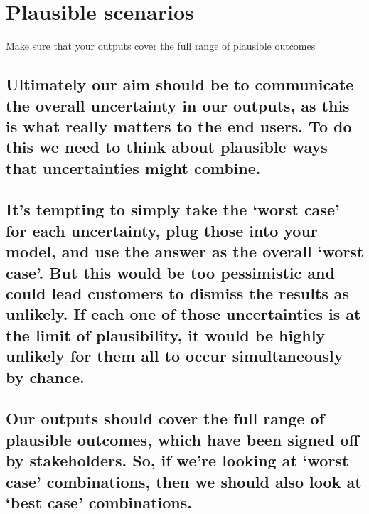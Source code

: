 \documentclass[]{book}
\begin{document}
\section{Plausible scenarios}\label{plausible-scenarios}

 Make sure that your outputs cover the full range of plausible outcomes

\subsection{Ultimately our aim should be to communicate the overall
uncertainty in our outputs, as this is what really matters to the end
users. To do this we need to think about plausible ways that
uncertainties might
combine.}\label{ultimately-our-aim-should-be-to-communicate-the-overall-uncertainty-in-our-outputs-as-this-is-what-really-matters-to-the-end-users.-to-do-this-we-need-to-think-about-plausible-ways-that-uncertainties-might-combine.}

\subsection{\texorpdfstring{It's tempting to simply take the `worst
case' for each uncertainty, plug those into your model, and use the
answer as the overall `worst case'. But this would be too pessimistic
and could lead customers to dismiss the results as unlikely. If each one
of those uncertainties is at the limit of plausibility, it would be
highly unlikely for them all to occur simultaneously by
chance.}{It's tempting to simply take the worst case for each uncertainty, plug those into your model, and use the answer as the overall worst case. But this would be too pessimistic and could lead customers to dismiss the results as unlikely. If each one of those uncertainties is at the limit of plausibility, it would be highly unlikely for them all to occur simultaneously by chance.}}\label{its-tempting-to-simply-take-the-worst-case-for-each-uncertainty-plug-those-into-your-model-and-use-the-answer-as-the-overall-worst-case.-but-this-would-be-too-pessimistic-and-could-lead-customers-to-dismiss-the-results-as-unlikely.-if-each-one-of-those-uncertainties-is-at-the-limit-of-plausibility-it-would-be-highly-unlikely-for-them-all-to-occur-simultaneously-by-chance.}

\subsection{\texorpdfstring{Our outputs should cover the full range of
plausible outcomes, which have been signed off by stakeholders. So, if
we're looking at `worst case' combinations, then we should also look at
`best case'
combinations.}{Our outputs should cover the full range of plausible outcomes, which have been signed off by stakeholders. So, if we're looking at worst case combinations, then we should also look at best case combinations.}}\label{our-outputs-should-cover-the-full-range-of-plausible-outcomes-which-have-been-signed-off-by-stakeholders.-so-if-were-looking-at-worst-case-combinations-then-we-should-also-look-at-best-case-combinations.}
\end{document}
